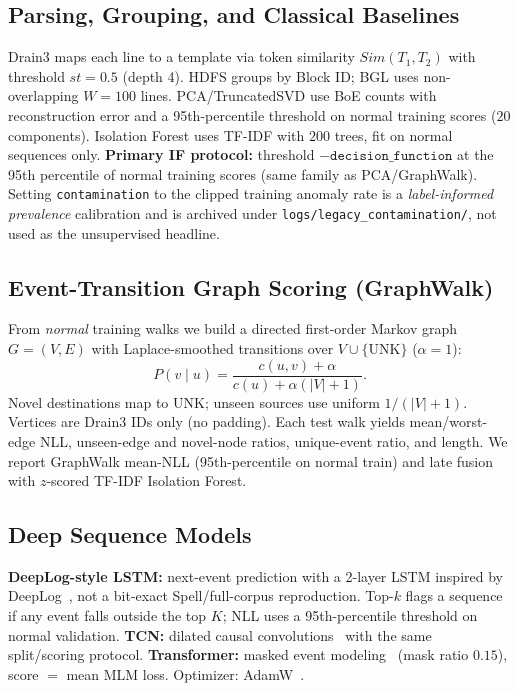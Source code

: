 \documentclass[runningheads]{llncs}
\begin{document}
\subsection{Parsing, Grouping, and Classical Baselines}
Drain3 maps each line to a template via token similarity $Sim(T_1,T_2)$ with threshold $st{=}0.5$ (depth 4). HDFS groups by Block ID; BGL uses non-overlapping $W{=}100$ lines. PCA/TruncatedSVD use BoE counts with reconstruction error and a 95th-percentile threshold on normal training scores ($20$ components). Isolation Forest uses TF-IDF with $200$ trees, fit on normal sequences only. \textbf{Primary IF protocol:} threshold $-\texttt{decision\_function}$ at the 95th percentile of normal training scores (same family as PCA/GraphWalk). Setting \texttt{contamination} to the clipped training anomaly rate is a \emph{label-informed prevalence} calibration and is archived under \texttt{logs/legacy\_contamination/}, not used as the unsupervised headline.

\subsection{Event-Transition Graph Scoring (GraphWalk)}
\label{sec:graphwalk}
From \emph{normal} training walks we build a directed first-order Markov graph $G=(V,E)$ with Laplace-smoothed transitions over $V\cup\{\mathrm{UNK}\}$ ($\alpha{=}1$):
\begin{equation}
P(v\mid u)=\frac{c(u,v)+\alpha}{c(u)+\alpha(|V|{+}1)}.
\end{equation}
Novel destinations map to $\mathrm{UNK}$; unseen sources use uniform $1/(|V|{+}1)$. Vertices are Drain3 IDs only (no padding). Each test walk yields mean/worst-edge NLL, unseen-edge and novel-node ratios, unique-event ratio, and length. We report GraphWalk mean-NLL (95th-percentile on normal train) and late fusion with $z$-scored TF-IDF Isolation Forest.

\subsection{Deep Sequence Models}
\textbf{DeepLog-style LSTM:} next-event prediction with a 2-layer LSTM inspired by DeepLog~\cite{b1}, not a bit-exact Spell/full-corpus reproduction. Top-$k$ flags a sequence if any event falls outside the top $K$; NLL uses a 95th-percentile threshold on normal validation. \textbf{TCN:} dilated causal convolutions~\cite{b19} with the same split/scoring protocol. \textbf{Transformer:} masked event modeling~\cite{b2,b4} (mask ratio $0.15$), score $=$ mean MLM loss. Optimizer: AdamW~\cite{b17}.
\end{document}
